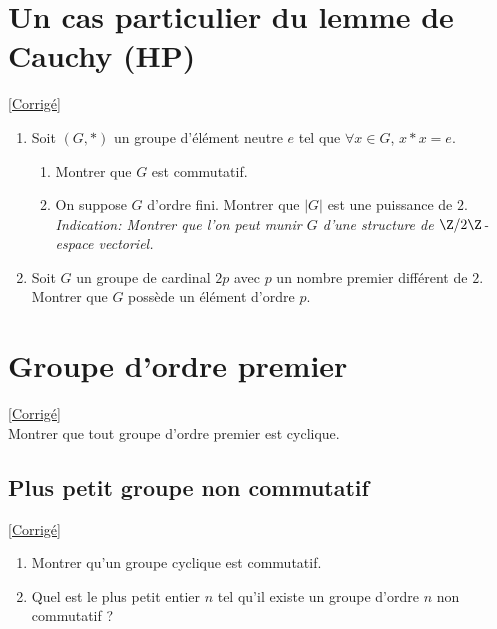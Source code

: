 \documentclass[8pt]{book}
\begin{document}
	\section{Un cas particulier du lemme de Cauchy  (HP)}
	\label{Un cas particulier du lemme de Cauchy}
	\textcolor{blue}{\hyperref[Un cas particulier du lemme de Cauchy corrigé]{[Corrigé]}}\\
	\begin{enumerate}[leftmargin=*]
		\item Soit $(G,*)$ un groupe d'élément neutre $e$ tel que $\forall x \in G$, $x*x=e$.
		\begin{enumerate}[label=\alph*.]
			\item Montrer que $G$ est commutatif.
			\item On suppose $G$ d'ordre fini. Montrer que $|G|$ est une puissance de $2$.\\    
			\textit{Indication: Montrer que l'on peut munir $G$ d'une structure de $\Z/2\Z$-espace vectoriel.}
		\end{enumerate}
		\item Soit $G$ un groupe de cardinal $2p$ avec $p$ un nombre premier différent de $2$. Montrer que $G$ possède un élément d'ordre $p$.
	\end{enumerate}
	
	\section{Groupe d'ordre premier }
	\label{Groupe d'ordre premier}
	\textcolor{blue}{\hyperref[Groupe d'ordre premier corrigé]{[Corrigé]}}\\
	Montrer que tout groupe d'ordre premier est cyclique.
	
	\subsection{Plus petit groupe non commutatif }
	\label{Plus petit groupe non commutatif}
	\textcolor{blue}{\hyperref[Plus petit groupe non commutatif corrigé]{[Corrigé]}}\\
	\begin{enumerate}[leftmargin=*]
		\item Montrer qu'un groupe cyclique est commutatif.
		\item Quel est le plus petit entier $n$ tel qu'il existe un groupe d'ordre $n$ non commutatif ?
	\end{enumerate}
	
\end{document}
